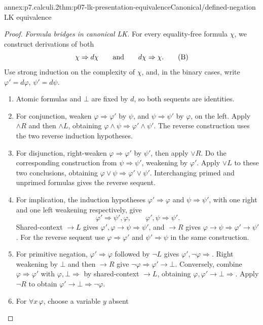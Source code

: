 \begin{annexitem}{annex:p7.calculi.2}{thm:p07-lk-presentation-equivalence}{Canonical/defined-negation LK equivalence}
\begin{proof}
\emph{Formula bridges in canonical LK.} For every equality-free formula
\(\chi\), we construct derivations of both
\[
 \chi\Rightarrow d\chi
 \qquad\hbox{and}\qquad
 d\chi\Rightarrow\chi.
 \tag{B}
\]
Use strong induction on the complexity of \(\chi\), and, in the binary
cases, write \(\varphi'=d\varphi\), \(\psi'=d\psi\).
\begin{enumerate}
\item Atomic formulas and \(\bot\) are fixed by \(d\), so both
      sequents are identities.
\item For conjunction, weaken \(\varphi\Rightarrow\varphi'\) by
      \(\psi\), and \(\psi\Rightarrow\psi'\) by \(\varphi\), on
      the left.  Apply \(\land R\) and then \(\land L\), obtaining
      \(\varphi\land\psi\Rightarrow\varphi'\land\psi'\).
      The reverse construction uses the two reverse induction hypotheses.
\item For disjunction, right-weaken
      \(\varphi\Rightarrow\varphi'\) by \(\psi'\), then apply
      \(\lor R\).  Do the corresponding construction from
      \(\psi\Rightarrow\psi'\), weakening by \(\varphi'\).
      Apply \(\lor L\) to these two conclusions, obtaining
      \(\varphi\lor\psi\Rightarrow\varphi'\lor\psi'\).
      Interchanging primed and unprimed formulas gives the reverse sequent.
\item For implication, the induction hypotheses
      \(\varphi'\Rightarrow\varphi\) and
      \(\psi\Rightarrow\psi'\), with one right and one left
      weakening respectively, give
      \[
       \varphi'\Rightarrow\psi',\varphi,
       \qquad \varphi',\psi\Rightarrow\psi'.
      \]
      Shared-context \(\to L\) gives
      \(\varphi',\varphi\to\psi\Rightarrow\psi'\), and
      \(\to R\) gives
      \(\varphi\to\psi\Rightarrow\varphi'\to\psi'\).
      For the reverse sequent use
      \(\varphi\Rightarrow\varphi'\) and
      \(\psi'\Rightarrow\psi\) in the same construction.
\item For primitive negation, \(\varphi'\Rightarrow\varphi\)
      followed by \(\neg L\) gives
      \(\varphi',\neg\varphi\Rightarrow\).  Right weakening by
      \(\bot\) and then \(\to R\) give
      \(\neg\varphi\Rightarrow\varphi'\to\bot\).
      Conversely, combine \(\varphi\Rightarrow\varphi'\) with
      \(\varphi,\bot\Rightarrow\) by shared-context \(\to L\),
      obtaining \(\varphi,\varphi'\to\bot\Rightarrow\).
      Apply \(\neg R\) to obtain
      \(\varphi'\to\bot\Rightarrow\neg\varphi\).
\item For \(\forall x\,\varphi\), choose a variable \(y\) absent

\end{enumerate}
\end{proof}
\end{annexitem}
